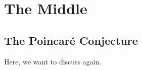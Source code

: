 \part{The Middle}

\chapter{The Poincar\'e Conjecture}\label{chapter:poincare}

Here, we want to discuss \cite{dieck2008algebraic} again.
